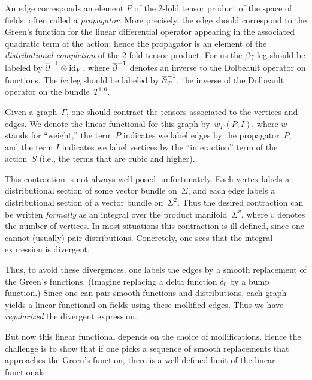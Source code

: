 An edge corresponds an element $P$ of the 2-fold tensor product of the space of fields,
often called a {\em propagator}.
More precisely, the edge should correspond to
the Green's function for the linear differential operator 
appearing in the associated quadratic term of the action;
hence the propagator is an element of the {\em distributional completion} of the 2-fold tensor product.
For us the $\beta\gamma$ leg should be labeled by $\overline{\partial}^{-1} \otimes {\rm id}_V$,
where $\overline{\partial}^{-1}$ denotes an inverse to the Dolbeault operator on functions.
The $bc$ leg should be labeled by $\overline{\partial}^{-1}_T$, 
the inverse of the Dolbeault operator on the bundle~$T^{1,0}$.

Given a graph~$\Gamma$, one should contract the tensors associated to the vertices and edges.
We denote the linear functional for this graph by~$w_\Gamma(P,I)$,
where $w$ stands for ``weight,'' the term $P$ indicates we label edges by the propagator~$P$,
and the term $I$ indicates we label vertices by the ``interaction'' term of the action~$S$ 
(i.e., the terms that are cubic and higher).

This contraction is not always well-posed, unfortunately.
Each vertex labels a distributional section of some vector bundle on~$\Sigma$,
and each edge labels a distributional section of a vector bundle on~$\Sigma^2$.
Thus the desired contraction can be written {\em formally} as an integral over the product manifold~$\Sigma^{v}$,
where $v$ denotes the number of vertices.
In most situations this contraction is ill-defined, 
since one cannot (usually) pair distributions.
Concretely, one sees that the integral expression is divergent.

Thus, to avoid these divergences, one labels the edges by a smooth replacement of the Green's functions. 
(Imagine replacing a delta function $\delta_0$ by a bump function.)
Since one can pair smooth functions and distributions,
each graph yields a linear functional on fields using these mollified edges.
Thus we have {\em regularized} the divergent expression.

But now this linear functional depends on the choice of mollifications.
Hence the challenge is to show that 
if one picks a sequence of smooth replacements that approaches the Green's function,
there is a well-defined limit of the linear functionals.

\subsubsection{}

